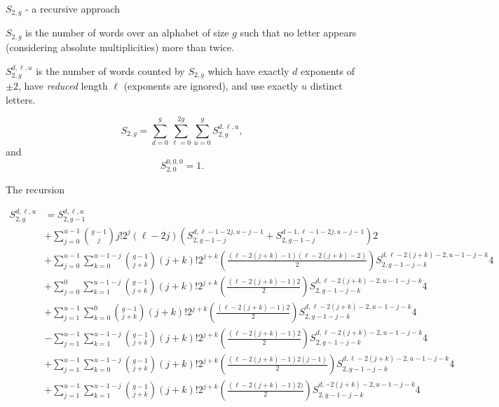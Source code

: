\begin{frame}{$S_{2,g}$ - a recursive approach}

  \begin{definition}
    $S_{2,g}$ is the number of words over an alphabet of size $g$ such
    that no letter appears (considering absolute multiplicities) more
    than twice.
  \end{definition}

  \pause

  \begin{definition}
    $S_{2,g}^{d,\ell,u}$ is the number of words counted by $S_{2,g}$ which
    have exactly $d$ exponents of $\pm 2$, have \emph{reduced} length
    $\ell$ (exponents are ignored), and use exactly $u$ distinct letters.
  \end{definition}

  \pause

  \[S_{2,g} = \sum_{d=0}^{g} \sum_{\ell=0}^{2g} \sum_{u=0}^{g}
    S_{2,g}^{d,\ell,u}, \]
  and
  \[ S_{2,0}^{0,0,0} = 1. \]


\end{frame}

\begin{frame}{The recursion}

{\tiny
\[
\begin{aligned}
  S_{2,g}^{d,\ell,u}
  &= S_{2,g-1}^{d,\ell,u} \\
  &+\sum_{j=0}^{u-1} {g-1 \choose j}  j!  2^j  (\ell - 2j)  \left( S_{2,g-1-j}^{d, \ell-1-2j, u-j-1} + S_{2,g-1-j}^{d-1,\ell-1-2j,u-j-1} \right)  2 \\
  &+  \sum_{j=0}^{u-1} \sum_{k=0}^{u-1-j} { g-1 \choose j + k}  (j + k)!  2^{j + k}  \left(\frac{(\ell - 2(j + k) - 1)  (\ell - 2 (j + k) - 2)}{2}\right)  S_{2,g-1-j-k}^{d,\ell-2(j+k) - 2,u-1-j-k}  4 \\
  &+ \sum_{j=0}^{0} \sum_{k=1}^{u-1-j} { g-1 \choose j + k} (j + k)!  2^{j
    + k} \left(\frac{(\ell - 2(j + k) - 1) 2}{2}\right)
  S_{2,g-1-j-k}^{d,\ell-2(j+k) - 2,u-1-j-k}  4 \\
  &+ \sum_{j=1}^{u-1} \sum_{k=0}^{0} { g-1 \choose j + k}  (j + k)!  2^{j + k} \left(\frac{(\ell - 2(j + k) - 1)  2}{2}\right)  S_{2,g-1-j-k}^{d,\ell-2(j+k) - 2,u-1-j-k}  4 \\
  &- \sum_{j=1}^{u-1} \sum_{k=1}^{u-1-j} { g-1 \choose j + k}  (j + k)!  2^{j + k}  \left(\frac{(\ell - 2(j + k) - 1)  2}{2}\right)  S_{2,g-1-j-k}^{d,\ell-2(j+k) - 2,u-1-j-k}  4 \\
  &+ \sum_{j=1}^{u-1} \sum_{k=0}^{u-1-j} { g-1 \choose j + k}  (j + k)!  2^{j + k}  \left(\frac{(\ell - 2(j + k) - 1)  2(j-1)}{2}\right)  S_{2,g-1-j-k}^{d,\ell-2(j+k) - 2,u-1-j-k}  4\\
  &+ \sum_{j=1}^{u-1} \sum_{k=1}^{u-1-j} { g-1 \choose j + k} (j + k)!
  2^{j + k} \left(\frac{(\ell - 2(j + k) - 1) 2)}{2}\right)
  S_{2,g-1-j-k}^{d,-2(j+k) - 2,u-1-j-k} 4
\end{aligned}
\]
}
\end{frame}

